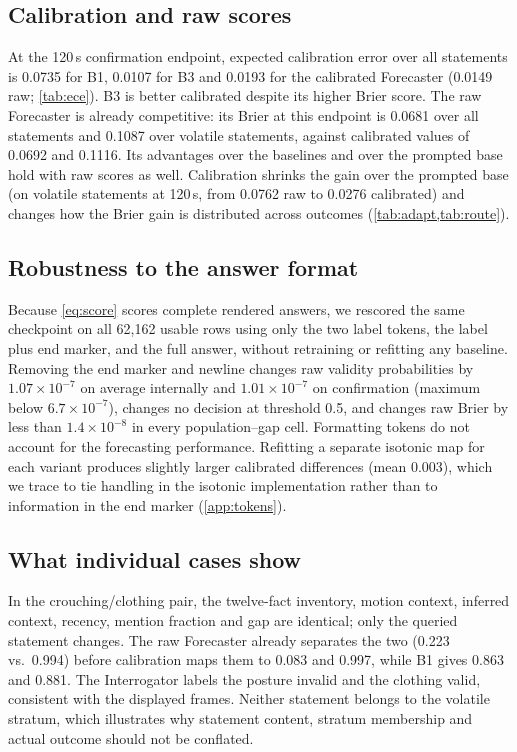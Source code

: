 \documentclass[10pt]{article}
\begin{document}
\subsection{Calibration and raw scores}
At the 120\,s confirmation endpoint, expected calibration error over all statements is 0.0735 for B1, 0.0107 for B3 and 0.0193 for the calibrated Forecaster (0.0149 raw; \cref{tab:ece}). B3 is better calibrated despite its higher Brier score. The raw Forecaster is already competitive: its Brier at this endpoint is 0.0681 over all statements and 0.1087 over volatile statements, against calibrated values of 0.0692 and 0.1116. Its advantages over the baselines and over the prompted base hold with raw scores as well. Calibration shrinks the gain over the prompted base (on volatile statements at 120\,s, from 0.0762 raw to 0.0276 calibrated) and changes how the Brier gain is distributed across outcomes (\cref{tab:adapt,tab:route}).

\subsection{Robustness to the answer format}
Because \cref{eq:score} scores complete rendered answers, we rescored the same checkpoint on all 62,162 usable rows using only the two label tokens, the label plus end marker, and the full answer, without retraining or refitting any baseline. Removing the end marker and newline changes raw validity probabilities by $1.07\times10^{-7}$ on average internally and $1.01\times10^{-7}$ on confirmation (maximum below $6.7\times10^{-7}$), changes no decision at threshold 0.5, and changes raw Brier by less than $1.4\times10^{-8}$ in every population--gap cell. Formatting tokens do not account for the forecasting performance. Refitting a separate isotonic map for each variant produces slightly larger calibrated differences (mean 0.003), which we trace to tie handling in the isotonic implementation rather than to information in the end marker (\cref{app:tokens}).

\subsection{What individual cases show}
In the crouching/clothing pair, the twelve-fact inventory, motion context, inferred context, recency, mention fraction and gap are identical; only the queried statement changes. The raw Forecaster already separates the two (0.223 vs.\ 0.994) before calibration maps them to 0.083 and 0.997, while B1 gives 0.863 and 0.881. The Interrogator labels the posture invalid and the clothing valid, consistent with the displayed frames. Neither statement belongs to the volatile stratum, which illustrates why statement content, stratum membership and actual outcome should not be conflated.
\end{document}
